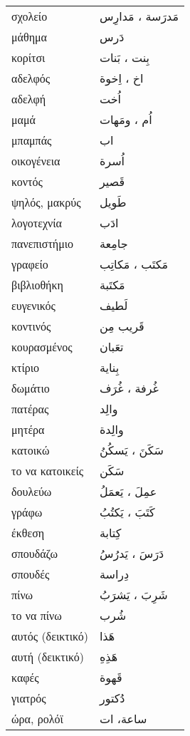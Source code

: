 \documentclass[twocolumn,a4paper]{article}
\newcommand{\ar}[1]{\textarabic{#1}}
\newcommand{\pl}{\raisebox{0.15ex}{\footnotesize ◍}}
\newcommand{\normpl}[1]{\ar{ #1، ات }}
\newcommand{\vrf}{\raisebox{0.15ex}{\footnotesize ◉}}
\newcommand{\mas}{\raisebox{0.15ex}{\footnotesize ◫}}
\begin{document}
\begin{mpsupertabular}{ P{0.5\textwidth} P{0.5\textwidth} }
σχολείο \pl & \ar{ مَدرَسة ، مَدارِس } \\
μάθημα      & \ar{ دَرس } \\
κορίτσι \pl & \ar{ بِنت ، بَنات } \\
αδελφός \pl & \ar{ اخ ، اِخوة } \\
αδελφή      & \ar{ اُخت } \\
μαμά \pl    & \ar{ اُم ، ومَهات} \\
μπαμπάς     & \ar{ اب } \\
οικογένεια  & \ar{ اُسرة } \\
κοντός      & \ar{ قَصير } \\
ψηλός, μακρύς & \ar{ طَويل } \\
λογοτεχνία  & \ar{ ادَب } \\
πανεπιστήμιο & \ar{ جامِعة } \\
γραφείο \pl & \ar{ مَكتَب ، مَكاتِب } \\
βιβλιοθήκη  & \ar{ مَكتَبة } \\
ευγενικός   & \ar{ لَطيف } \\
κοντινός    & \ar{ قَريب مِن } \\
κουρασμένος & \ar{ تعَبان } \\
κτίριο      & \ar{ بِناية } \\
δωμάτιο \pl & \ar{ غُرفة ، غُرَف } \\
πατέρας     & \ar{ والِد} \\
μητέρα      & \ar{ والِدة } \\
κατοικώ \vrf  & \ar{ سَكَنَ ، يَسكُنُ } \\
το να κατοικείς \mas  & \ar{ سَكَن } \\
δουλεύω \vrf& \ar{ عمِلَ ، يَعمَلُ } \\
γράφω \vrf  & \ar{ كَتَبَ ، يَكتُبُ } \\
έκθεση \mas & \ar{ كِتابة } \\
σπουδάζω \vrf & \ar{ دَرَسَ ، يَدرُسُ } \\
σπουδές \mas  & \ar{ دِراسة } \\
πίνω \vrf   & \ar{ شَرِبَ ، يَشرَبُ } \\
το να πίνω \mas & \ar{ شُرب } \\
αυτός (δεικτικό) & \ar{ هَذا } \\
αυτή (δεικτικό)  & \ar{ هَذِهِ } \\
καφές       & \ar{ قَهوة } \\
γιατρός     & \ar{ دُكتور } \\
ώρα, ρολόϊ   & \normpl{ ساعة} \\

\end{mpsupertabular}
\end{document}
